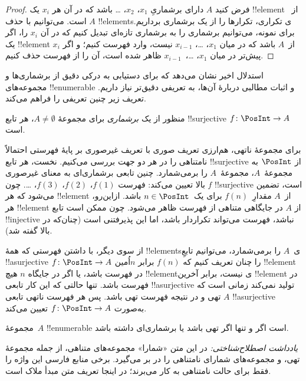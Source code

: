 \documentclass[../../../include/open-logic-section]{subfiles}
\begin{document}
\begin{proof}
  فرض کنید $A$ دارای برشماریِ $x_1$، $x_2$، \dots{} باشد که در آن هر
  $x_i$ یک !!{element} از~$A$ است. می‌توانیم با حذف !!{element}sی تکراری،
  تکرارها را از یک برشماری برداریم. برای نمونه، می‌توانیم برشماری را به
  برشماری تازه‌ای تبدیل کنیم که در آن $x_i$ را، اگر یک !!{element} از~$A$
  باشد که در میان $x_1$، \dots، $x_{i-1}$ نیست، وارد فهرست کنیم؛ و اگر
  $x_i$ پیش‌تر در میان $x_1$، \dots،~$x_{i-1}$ ظاهر شده است، آن را از
  فهرست حذف کنیم.
\end{proof}

استدلال اخیر نشان می‌دهد که برای دستیابی به درکی دقیق از
برشماری‌ها و مجموعه‌های !!{enumerable} و اثبات مطالبی دربارهٔ آن‌ها،
به تعریفی دقیق‌تر نیاز داریم. تعریف زیر چنین تعریفی را فراهم می‌کند.

\begin{defn}
منظور از یک \emph{برشماری} برای مجموعهٔ $A \neq \emptyset$، هر تابع
!!{surjective} $f \colon \PosInt \to A$ است.
\end{defn}

\begin{explain}
برای مجموعهٔ ناتهی، هم‌ارزی تعریف صوری با تعریف غیرصوری بر پایهٔ
فهرستی احتمالاً نامتناهی را در هر دو جهت بررسی می‌کنیم. نخست، هر تابع !!{surjective} از
$\PosInt$ به مجموعهٔ~$A$، مجموعهٔ~$A$ را برمی‌شمارد. چنین تابعی
برشماری‌ای به معنای غیرصوری بالا تعیین می‌کند: فهرست $f(1)$، $f(2)$،
$f(3)$، \dots. چون $f$ !!{surjective} است، تضمین می‌شود که هر
!!{element} از~$A$ مقدارِ~$f(n)$ برای یک~$n \in \PosInt$ باشد. ازاین‌رو،
هر !!{element} از $A$ در جایگاهی متناهی از فهرست ظاهر می‌شود. چون ممکن
است تابع !!{injective} نباشد، فهرست می‌تواند تکراردار باشد، اما این
پذیرفتنی است (چنان‌که در بالا گفته شد).

از سوی دیگر، با داشتن فهرستی که همهٔ !!{element}sی~$A$ را
برمی‌شمارد، می‌توانیم تابعِ !!a{surjective} $f\colon \PosInt \to A$ را
چنان تعریف کنیم که $f(n)$ برابر $n$اُمین !!{element} در فهرست باشد، یا اگر
در جایگاه $n$ هیچ !!{element}ی نیست، برابر آخرین !!{element} در فهرست باشد.
تنها حالتی که این کار تابعی !!a{surjective} تولید نمی‌کند زمانی است که
$A$ تهی و در نتیجه فهرست تهی باشد. پس هر فهرست ناتهی تابعی
!!a{surjective} به‌صورت $f\colon \PosInt \to A$ تعیین می‌کند.
\end{explain}

\begin{defn}
  مجموعهٔ~$A$ !!{enumerable} است اگر و تنها اگر تهی باشد یا برشماری‌ای داشته باشد.

\emph{یادداشت اصطلاح‌شناختی:} در این متن «شمارا» مجموعه‌های متناهی، از جمله
مجموعهٔ تهی، و مجموعه‌های شمارای نامتناهی را در بر می‌گیرد. برخی منابع فارسی
این واژه را فقط برای حالت نامتناهی به کار می‌برند؛ در اینجا تعریف متن مبدأ ملاک است.
\end{defn}
\end{document}
